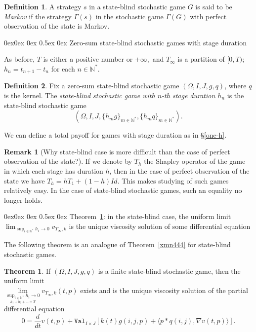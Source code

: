 \documentclass[english,openary,12pt]{article}
\makeatletter
\renewcommand\subsection{\@startsection{subsection}{2}{\z@}%
                                     {0ex\@plus 0ex \@minus 0ex}%
                                     {0.5ex \@plus 0ex}%
                                     {\normalfont\Large\bfseries}}%
\theoremstyle{definition}
\newtheorem{remark}{Remark}
\newtheorem{definition}{Definition}
\newtheorem{theorem}{Theorem}
\newcommand{\N}{\mathbb{N}}
\makeatother
\begin{document}
\begin{definition}
A strategy $s$ in a state-blind stochastic game $G$ is said to be 
\emph{Markov} if the strategy
$\Gamma(s)$ in the stochastic game $\Gamma(G)$ with 
perfect observation of the state is Markov.
\end{definition}

\subsection{Zero-sum state-blind stochastic games with stage duration}
\label{def1}

As before, $T$ is either a positive number or $+\infty$, and $T_\infty$ is a partition of $[0,T)$; $h_n = t_{n+1}-t_n$ for each $n \in \N^*$.

\begin{definition}
Fix a zero-sum state-blind stochastic game 
$(\Omega, I, J, g, q)$, 
where $q$ is the kernel. 
The \emph{state-blind stochastic game with $n$-th stage duration $h_n$} 
is the state-blind stochastic game
$$(\Omega, I, J, \{h_m g\}_{m\in\N^*}, \{h_m q\}_{m\in\N^*}).$$
\end{definition}
We can define a total payoff for games with stage duration as in \S\ref{one-h}. 


\begin{remark}[Why state-blind case is more difficult than the case of perfect observation of the state?]
If we denote by $T_h$ the Shapley operator of the game in which each stage has duration $h$, then in the case of perfect observation of the state we have
$T_h = h T_1 + (1-h)Id$.
This makes studying of such games relatively easy. In the case of state-blind stochastic games, such an equality no longer holds.
\end{remark}


\subsection{Theorem~\ref{thh1}: in the state-blind case, the uniform limit 
$\lim_{\sup_{i\in\N^*} h_i \to 0} v_{T_\infty,k}$ is the unique
viscosity solution of some differential equation}

\label{jjjnt44}

The following theorem is an analogue of Theorem~\ref{xmn444} for state-blind stochastic games.

\begin{theorem}
\label{thh1}
If $(\Omega, I, J, g, q)$ is a finite state-blind stochastic game, then the uniform limit \\
$\lim\limits_{\underset{h_1+h_2+\ldots = T}{\sup_{i\in\N^*} h_i \to 0}} 
v_{T_\infty,k}(t,p)$ exists and is the unique viscosity solution of the partial differential equation
\begin{equation}
\label{rlp3}
0 = \frac{d}{dt} v(t,p) + \texttt{Val}_{I\times J} [k(t) g(i,j,p) + 
\langle p * q(i,j), \nabla v(t,p) \rangle].
\end{equation}
\end{theorem}
\end{document}
